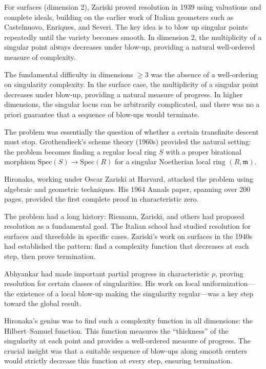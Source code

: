 For surfaces (dimension 2), Zariski proved resolution in 1939 using valuations and complete ideals, building on the earlier work of Italian geometers such as Castelnuovo, Enriques, and Severi. The key idea is to blow up singular points repeatedly until the variety becomes smooth. In dimension 2, the multiplicity of a singular point always decreases under blow-up, providing a natural well-ordered measure of complexity.

The fundamental difficulty in dimensions $\geq 3$ was the absence of a well-ordering on singularity complexity. In the surface case, the multiplicity of a singular point decreases under blow-up, providing a natural measure of progress. In higher dimensions, the singular locus can be arbitrarily complicated, and there was no a priori guarantee that a sequence of blow-ups would terminate.

The problem was essentially the question of whether a certain transfinite descent must stop. Grothendieck's scheme theory (1960s) provided the natural setting: the problem becomes finding a regular local ring $S$ with a proper birational morphism $\text{Spec}(S) \to \text{Spec}(R)$ for a singular Noetherian local ring $(R, \mathfrak{m})$.

Hironaka, working under Oscar Zariski at Harvard, attacked the problem using algebraic and geometric techniques. His 1964 Annals paper, spanning over 200 pages, provided the first complete proof in characteristic zero.

The problem had a long history: Riemann, Zariski, and others had proposed resolution as a fundamental goal. The Italian school had studied resolution for surfaces and threefolds in specific cases. Zariski's work on surfaces in the 1940s had established the pattern: find a complexity function that decreases at each step, then prove termination.

Abhyankar had made important partial progress in characteristic $p$, proving resolution for certain classes of singularities. His work on local uniformization---the existence of a local blow-up making the singularity regular---was a key step toward the global result.

Hironaka's genius was to find such a complexity function in all dimensions: the Hilbert--Samuel function. This function measures the ``thickness'' of the singularity at each point and provides a well-ordered measure of progress. The crucial insight was that a suitable sequence of blow-ups along smooth centers would strictly decrease this function at every step, ensuring termination.

